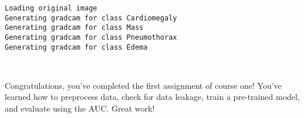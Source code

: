\documentclass[11pt]{article}
\begin{document}
    \begin{Verbatim}[commandchars=\\\{\}]
Loading original image
Generating gradcam for class Cardiomegaly
Generating gradcam for class Mass
Generating gradcam for class Pneumothorax
Generating gradcam for class Edema

    \end{Verbatim}

    \begin{center}
    \end{center}
    { \hspace*{\fill} \\}
    
    Congratulations, you've completed the first assignment of course one!
You've learned how to preprocess data, check for data leakage, train a
pre-trained model, and evaluate using the AUC. Great work!


    
    
    
    
\end{document}
